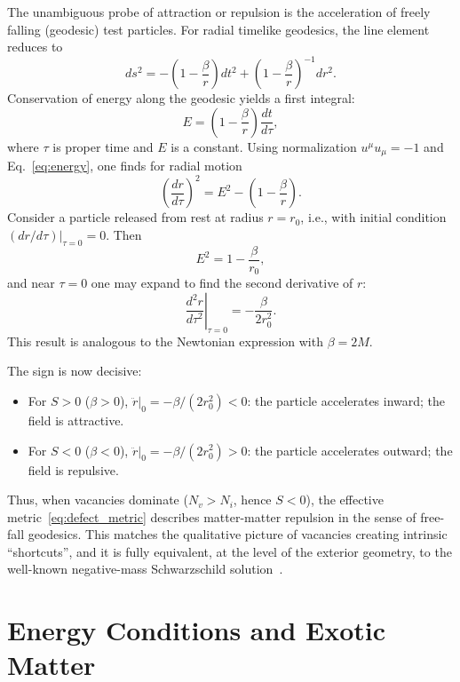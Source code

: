 \documentclass[%
  reprint,
  superscriptaddress,
  showpacs,
  showkeys,
  amsmath,amssymb,
  pra,
  longbibliography,
  floatfix,
  x11names
]{revtex4-2}
\begin{document}
The unambiguous probe of attraction or repulsion is the acceleration of freely falling (geodesic) test particles. For radial timelike geodesics, the line element reduces to
\begin{equation}
ds^2 = -\left(1-\frac{\beta}{r}\right) dt^2
+ \left(1-\frac{\beta}{r}\right)^{-1} dr^2.
\end{equation}
Conservation of energy along the geodesic yields a first integral:
\begin{equation}
E = \left(1-\frac{\beta}{r}\right)\frac{dt}{d\tau},
\label{eq:energy}
\end{equation}
where \(\tau\) is proper time and \(E\) is a constant. Using normalization \(u^\mu u_\mu=-1\) and Eq.~\eqref{eq:energy}, one finds for radial motion
\begin{equation}
\left(\frac{dr}{d\tau}\right)^2 = E^2 - \left(1-\frac{\beta}{r}\right).
\end{equation}
Consider a particle released from rest at radius \(r=r_0\), i.e., with initial condition \((dr/d\tau)|_{\tau=0}=0\). Then
\begin{equation}
E^2 = 1-\frac{\beta}{r_0},
\end{equation}
and near \(\tau=0\) one may expand to find the second derivative of \(r\):
\begin{equation}
\left.\frac{d^2 r}{d\tau^2}\right|_{\tau=0}
= -\frac{\beta}{2 r_0^2}.
\end{equation}
This result is analogous to the Newtonian expression with \(\beta=2M\).

The sign is now decisive:
\begin{itemize}
\item For \(S>0\) (\(\beta>0\)), \(\ddot{r}|_0 = -\beta/(2r_0^2)<0\): the particle accelerates inward; the field is attractive.
\item For \(S<0\) (\(\beta<0\)), \(\ddot{r}|_0 = -\beta/(2r_0^2)>0\): the particle accelerates outward; the field is repulsive.
\end{itemize}
Thus, when vacancies dominate (\(N_v > N_i\), hence \(S<0\)), the effective metric~\eqref{eq:defect_metric} describes matter-matter repulsion in the sense of free-fall geodesics. This matches the qualitative picture of vacancies creating intrinsic ``shortcuts'', and it is fully equivalent, at the level of the exterior geometry, to the well-known negative-mass Schwarzschild solution~\cite{bondi-1957}.

\section{Energy Conditions and Exotic Matter}
\label{sec:energy}
\end{document}
